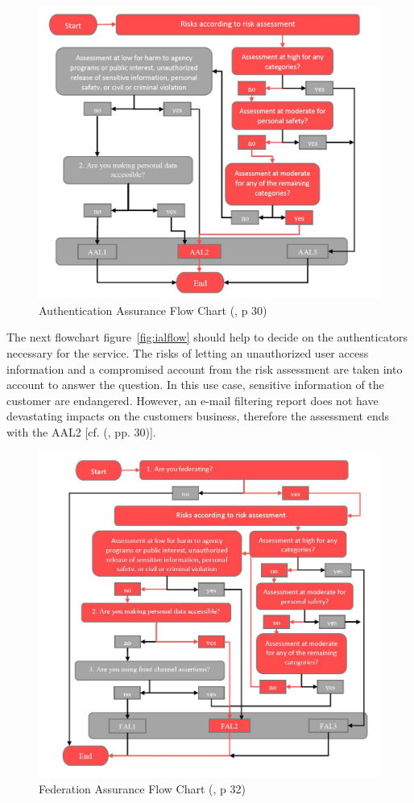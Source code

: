 \begin{figure}[h]
	\centering
	\includegraphics[width=0.9\linewidth]{images/aal_flow_colored}
	\caption{Authentication Assurance Flow Chart (\cite{NIST:2017:DIG}, p 30)}
	\label{fig:aalflow}
\end{figure}

The next flowchart figure~\ref{fig:ialflow} should help to decide on the authenticators necessary for the service. The risks of letting an unauthorized user access information and a compromised account from the risk assessment are taken into account to answer the question. In this use case, sensitive information of the customer are endangered. However, an e-mail filtering report does not have devastating impacts on the customers business, therefore the assessment ends with the AAL2 [cf. (\cite{NIST:2017:DIG}, pp. 30)].  

\pagebreak[4]

\begin{figure}[h]
	\centering
	\includegraphics[width=0.9\linewidth]{images/fal_flow_colored}
	\caption{Federation Assurance Flow Chart (\cite{NIST:2017:DIG}, p 32)}
	\label{fig:falflow}
\end{figure}

